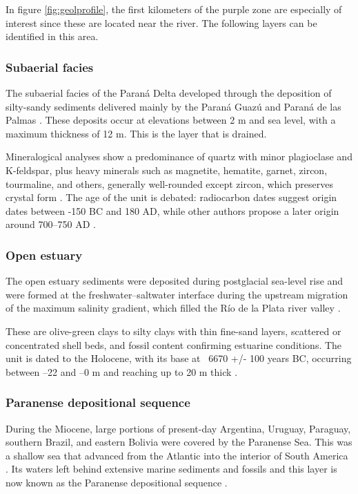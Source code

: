 In figure \ref{fig:geolprofile}, the first kilometers of the purple zone are especially of interest since these are located near the river. The following layers can be identified in this area.

\subsubsection{Subaerial facies}
The subaerial facies of the Paraná Delta developed through the deposition of silty-sandy sediments delivered mainly by the Paraná Guazú and Paraná de las Palmas \autocite{joseluiscavallottoEvolucionCambiosAmbientales2005}. These deposits occur at elevations between 2 m and sea level, with a maximum thickness of 12 m. This is the layer that is drained.

Mineralogical analyses show a predominance of quartz with minor plagioclase and K-feldspar, plus heavy minerals such as magnetite, hematite, garnet, zircon, tourmaline, and others, generally well-rounded except zircon, which preserves crystal form \autocite{rafaelcordiniContribucionConocimientoGeologia1949}. The age of the unit is debated: radiocarbon dates suggest origin dates between -150 BC and 180 AD, while other authors propose a later origin around 700–750 AD \autocite{joseluiscavallottoEvolucionCambiosAmbientales2005}.

\subsubsection{Open estuary}
The open estuary sediments were deposited during postglacial sea-level rise and were formed at the freshwater–saltwater interface during the upstream migration of the maximum salinity gradient, which filled the Río de la Plata river valley \autocite{joseluiscavallottoEvolucionCambiosAmbientales2005}.

These are olive-green clays to silty clays with thin fine-sand layers, scattered or concentrated shell beds, and fossil content confirming estuarine conditions. The unit is dated to the Holocene, with its base at ~6670 +/- 100 years BC, occurring between –22 and –0 m and reaching up to 20 m thick \autocite{vogelGroningenRadiocarbonDates1969}.

\subsubsection{Paranense depositional sequence}
During the Miocene, large portions of present-day Argentina, Uruguay, Paraguay, southern Brazil, and eastern Bolivia were covered by the Paranense Sea. This was a shallow sea that advanced from the Atlantic into the interior of South America . Its waters left behind extensive marine sediments and fossils and this layer is now known as the Paranense depositional sequence \autocite{tineoReconstructingSouthAmerican2024}.

